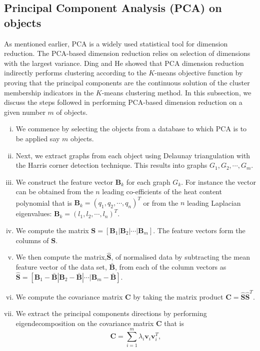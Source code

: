 \documentclass[10pt,a4paper]{article}
\begin{document}
\subsection{Principal Component Analysis (PCA) on objects}
As mentioned earlier, PCA is a widely used statistical tool for dimension reduction. The PCA-based dimension reduction relies on selection of dimensions with the largest variance. Ding and He \citep{ding2004k} showed that PCA dimension reduction indirectly performs clustering according to the $K$-means objective function by proving that the principal components are the continuous solution of the cluster membership indicators in the $K$-means clustering method.
In this subsection, we discuss the steps followed in performing  PCA-based dimension reduction on a given number $m$ of objects.
\begin{enumerate}[i)]
	\item We commence by selecting the objects from a database to which PCA is to be applied say $m$ objects.
	\item Next, we extract graphs from each object using Delaunay triangulation with the Harris corner detection technique. This results into graphs $G_1, G_2, \cdots, G_m$.
	\item We construct the feature vector $\mathbf{B}_k$ for each graph $G_k$. For instance the vector can be obtained from the $n$ leading co-efficients of the heat content polynomial that is $\mathbf{B}_k = (q_1,q_2, \cdots, q_n)^T$ or from the $n$ leading Laplacian eigenvalues: $\mathbf{B}_k = (l_1, l_2, \cdots, l_n)^T$.
	\item We compute the matrix $\mathbf{S}=[ \mathbf{B}_1|\mathbf{B}_2| \cdots | \mathbf{B}_m]$. The feature vectors form the columns of $\mathbf{S}$.
	\item We then compute the matrix,$\hat{\mathbf{S}}$, of normalised data by subtracting the mean feature vector of the data set, $\mathbf{\bar{B}}$, from each of the column vectors as  
	$\hat{\mathbf{S}}=[ \mathbf{B}_1-\mathbf{\bar{B}}|\mathbf{B}_2-\mathbf{\bar{B}}| \cdots | \mathbf{B}_m -\mathbf{\bar{B}}]$. 
	\item We compute the covariance matrix $\mathbf{C}$ by taking the matrix product $\mathbf{C} = \hat{\mathbf{S}} \hat{\mathbf{S}}^T$.
	\item We extract the principal components directions by performing eigendecomposition on the covariance matrix $\mathbf{C}$ that is 
	\begin{equation}
	\mathbf{C} = \sum _{i=1} ^m \lambda_i \mathbf{v}_i \mathbf{v}_i^T,

\end{equation}
\end{enumerate}
\end{document}

